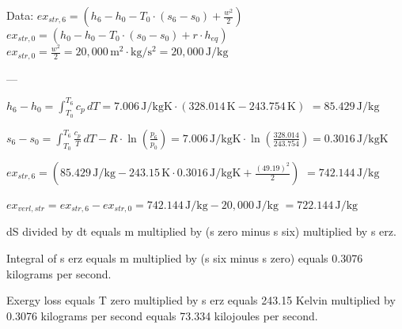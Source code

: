 Data:  
\( ex_{str,6} = (h_6 - h_0 - T_0 \cdot (s_6 - s_0) + \frac{w^2}{2}) \)  
\( ex_{str,0} = (h_0 - h_0 - T_0 \cdot (s_0 - s_0) + r \cdot h_{eq}) \)  
\( ex_{str,0} = \frac{w^2}{2} = 20,000 \, \text{m}^2 \cdot \text{kg}/\text{s}^2 = 20,000 \, \text{J/kg} \)  

---

\( h_6 - h_0 = \int_{T_0}^{T_6} c_p \, dT = 7.006 \, \text{J/kgK} \cdot (328.014 \, \text{K} - 243.754 \, \text{K}) \)  
\( = 85.429 \, \text{J/kg} \)  

\( s_6 - s_0 = \int_{T_0}^{T_6} \frac{c_p}{T} \, dT - R \cdot \ln \left( \frac{p_6}{p_0} \right) = 7.006 \, \text{J/kgK} \cdot \ln \left( \frac{328.014}{243.754} \right) = 0.3016 \, \text{J/kgK} \)  

\( ex_{str,6} = (85.429 \, \text{J/kg} - 243.15 \, \text{K} \cdot 0.3016 \, \text{J/kgK} + \frac{(49.19)^2}{2}) \)  
\( = 742.144 \, \text{J/kg} \)  

\( ex_{verl,str} = ex_{str,6} - ex_{str,0} = 742.144 \, \text{J/kg} - 20,000 \, \text{J/kg} \)  
\( = 722.144 \, \text{J/kg} \)

dS divided by dt equals m multiplied by (s zero minus s six) multiplied by s erz.  

Integral of s erz equals m multiplied by (s six minus s zero) equals 0.3076 kilograms per second.  

Exergy loss equals T zero multiplied by s erz equals 243.15 Kelvin multiplied by 0.3076 kilograms per second equals 73.334 kilojoules per second.